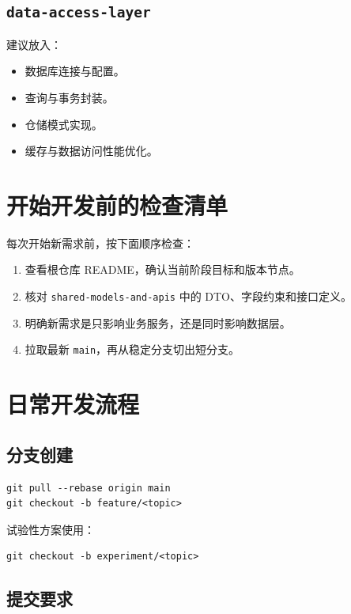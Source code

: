\documentclass[11pt,a4paper]{ctexart}
\begin{document}
\subsection{\texttt{data-access-layer}}

建议放入：

\begin{itemize}
  \item 数据库连接与配置。
  \item 查询与事务封装。
  \item 仓储模式实现。
  \item 缓存与数据访问性能优化。
\end{itemize}

\section{开始开发前的检查清单}

每次开始新需求前，按下面顺序检查：

\begin{enumerate}
  \item 查看根仓库 README，确认当前阶段目标和版本节点。
  \item 核对 \texttt{shared-models-and-apis} 中的 DTO、字段约束和接口定义。
  \item 明确新需求是只影响业务服务，还是同时影响数据层。
  \item 拉取最新 \texttt{main}，再从稳定分支切出短分支。
\end{enumerate}

\section{日常开发流程}

\subsection{分支创建}

\begin{verbatim}
git pull --rebase origin main
git checkout -b feature/<topic>
\end{verbatim}

试验性方案使用：

\begin{verbatim}
git checkout -b experiment/<topic>
\end{verbatim}

\subsection{提交要求}
\end{document}
